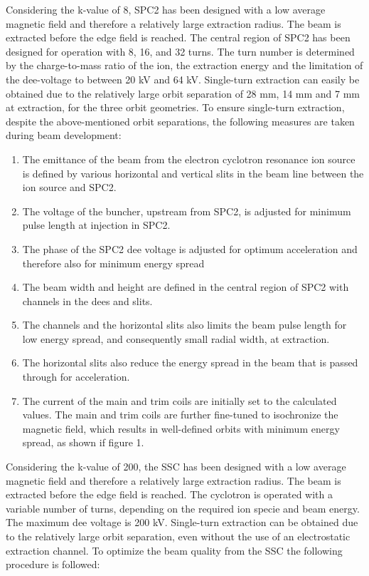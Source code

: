 \documentclass[11pt]{report}
\begin{document}
Considering the k-value of 8, SPC2 has been designed with a low average magnetic field and therefore a relatively large extraction radius. The beam is extracted before the edge field is reached. The central region of SPC2 has been designed for operation with 8, 16, and 32 turns. The turn number is determined by the charge-to-mass ratio of the ion, the extraction energy and the limitation of the dee-voltage to between 20 kV and 64 kV. Single-turn extraction can easily be obtained due to the relatively large orbit separation of 28 mm, 14 mm and 7 mm at extraction, for the three orbit geometries.
To ensure single-turn extraction, despite the above-mentioned orbit separations, the following measures are taken during beam development:
\begin{enumerate}
\item The emittance of the beam from the electron cyclotron resonance ion source is defined by various horizontal and vertical slits in the beam line between the ion source and SPC2.
\item The voltage of the buncher, upstream from SPC2, is adjusted for minimum pulse length at injection in SPC2.
\item The phase of the SPC2 dee voltage is adjusted for optimum acceleration and therefore also for minimum energy spread
\item The beam width and height are defined in the central region of SPC2 with channels in the dees and slits.
\item The channels and the horizontal slits also limits the beam pulse length for low energy spread, and consequently small radial width, at extraction.
\item The horizontal slits also reduce the energy spread in the beam that is passed through for acceleration.
\item The current of the main and trim coils are initially set to the calculated values. The main and trim coils are further fine-tuned to isochronize the magnetic field, which results in well-defined orbits with minimum energy spread, as shown if figure 1. 
\end{enumerate}

Considering the k-value of 200, the SSC has been designed with a low average magnetic field and therefore a relatively large extraction radius. The beam is extracted before the edge field is reached. The cyclotron is operated with a variable number of turns, depending on the required ion specie and beam energy. The maximum dee voltage is 200 kV. Single-turn extraction can be obtained due to the relatively large orbit separation, even without the use of an electrostatic extraction channel. To optimize the beam quality from the SSC the following procedure is followed:
\end{document}
